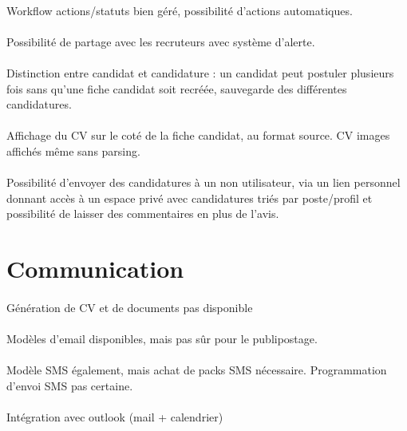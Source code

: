 \paragraph{} Workflow actions/statuts bien géré, possibilité d'actions automatiques.
\paragraph{} Possibilité de partage avec les recruteurs avec système d'alerte.
\paragraph{} Distinction entre candidat et candidature : un candidat peut postuler plusieurs fois sans qu'une fiche candidat soit recréée, sauvegarde des différentes candidatures.
\paragraph{} Affichage du CV sur le coté de la fiche candidat, au format source. CV images affichés même sans parsing.
\paragraph{} Possibilité d'envoyer des candidatures à un non utilisateur, via un lien personnel donnant accès à un espace privé avec candidatures triés par poste/profil et possibilité de laisser des commentaires en plus de l'avis.


\section{Communication}
\paragraph{} Génération de CV et de documents pas disponible
\paragraph{} Modèles d'email disponibles, mais pas sûr pour le publipostage.
\paragraph{} Modèle SMS également, mais achat de packs SMS nécessaire. Programmation d'envoi SMS pas certaine.
\paragraph{} Intégration avec outlook (mail + calendrier)
